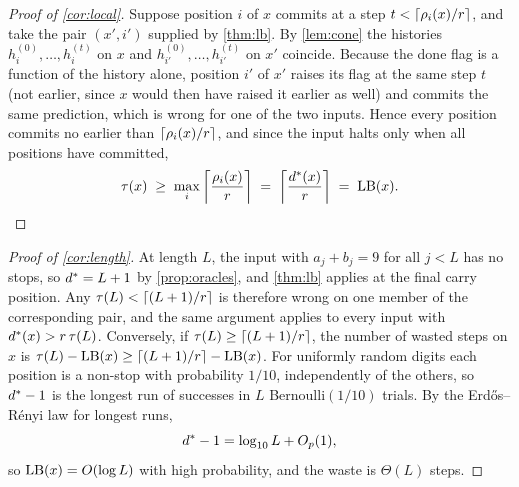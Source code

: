 \begin{proof}[Proof of \cref{cor:local}]
Suppose position $i$ of $x$ commits at a step $t<\lceil\rho_i(x)/r\rceil$, and take the pair $(x',i')$
supplied by \cref{thm:lb}. By \cref{lem:cone} the histories $h_i^{(0)},\dots,h_i^{(t)}$ on $x$ and
$h_{i'}^{(0)},\dots,h_{i'}^{(t)}$ on $x'$ coincide. Because the done flag is a function of the history
alone, position $i'$ of $x'$ raises its flag at the same step $t$ (not earlier, since $x$ would then have
raised it earlier as well) and commits the same prediction, which is wrong for one of the two inputs.
Hence every position commits no earlier than $\lceil\rho_i(x)/r\rceil$, and since the input halts only when
all positions have committed,
\begin{equation*}
  \tau(x)\;\ge\;\max_i\,\ceil*{\frac{\rho_i(x)}{r}} \;=\; \ceil*{\frac{\dstar(x)}{r}} \;=\; \LB(x).
  \qedhere
\end{equation*}
\end{proof}

\begin{proof}[Proof of \cref{cor:length}]
At length $L$, the input with $a_j+b_j=9$ for all $j<L$ has no stops, so $d^{*}=L+1$ by
\cref{prop:oracles}, and \cref{thm:lb} applies at the final carry position. Any $\tau(L)<\lceil(L+1)/r\rceil$
is therefore wrong on one member of the corresponding pair, and the same argument applies to every
input with $d^{*}(x)>r\,\tau(L)$. Conversely, if $\tau(L)\ge\lceil(L+1)/r\rceil$, the number of wasted steps
on $x$ is $\tau(L)-\operatorname{LB}(x)\ge\lceil(L+1)/r\rceil-\operatorname{LB}(x)$. For uniformly random digits each position is a
non-stop with probability $1/10$, independently of the others, so $d^{*}-1$ is the longest run of
successes in $L$ Bernoulli$(1/10)$ trials. By the Erd\H{o}s--R\'enyi law for longest runs,
\begin{equation*}
  d^{*} - 1 = \log_{10} L + O_p(1),
\end{equation*}
so $\operatorname{LB}(x)=O(\log L)$ with high probability, and the waste is $\Theta(L)$ steps.
\end{proof}

